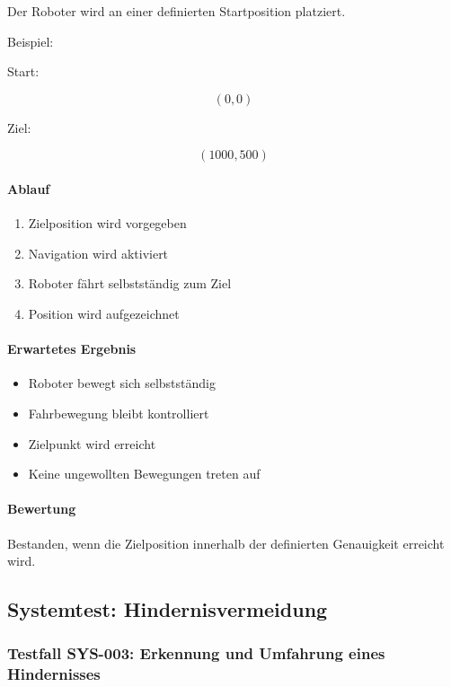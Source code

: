\documentclass[
  a4paper,
  12pt,
  DIV=12,        %
  parskip=half,  %
  headings=small %
]{scrartcl}
\theoremstyle{definition}
\providecommand{\tightlist}{%
  \setlength{\itemsep}{0pt}\setlength{\parskip}{0pt}}
\theoremstyle{definition}
\begin{document}
Der Roboter wird an einer definierten Startposition platziert.

Beispiel:

Start:

\[
(0,0)
\]

Ziel:

\[
(1000,500)
\]

\paragraph{Ablauf}\label{ablauf-25}

\begin{enumerate}
\def\labelenumi{\arabic{enumi}.}
\tightlist
\item
  Zielposition wird vorgegeben
\item
  Navigation wird aktiviert
\item
  Roboter fährt selbstständig zum Ziel
\item
  Position wird aufgezeichnet
\end{enumerate}

\paragraph{Erwartetes Ergebnis}\label{erwartetes-ergebnis-25}

\begin{itemize}
\tightlist
\item
  Roboter bewegt sich selbstständig
\item
  Fahrbewegung bleibt kontrolliert
\item
  Zielpunkt wird erreicht
\item
  Keine ungewollten Bewegungen treten auf
\end{itemize}

\paragraph{Bewertung}\label{bewertung-25}

Bestanden, wenn die Zielposition innerhalb der definierten Genauigkeit
erreicht wird.

\subsection{Systemtest:
Hindernisvermeidung}\label{systemtest-hindernisvermeidung}

\subsubsection{Testfall SYS-003: Erkennung und Umfahrung eines
Hindernisses}\label{testfall-sys-003-erkennung-und-umfahrung-eines-hindernisses}
\end{document}
